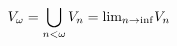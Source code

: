 \documentclass[preview]{standalone}
\begin{document}
\begin{align*}
\special{dvisvgm:raw <g id='unique000'>}V_\omega  = \bigcup_{n<\omega} V_n = \text{lim}_{n\rightarrow \inf} V_n\special{dvisvgm:raw </g>}
\end{align*}
\end{document}
